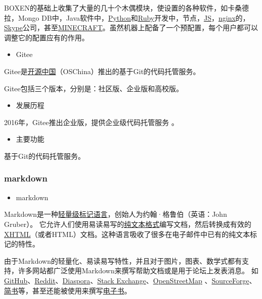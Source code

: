 \documentclass[
]{article}
\begin{document}
BOXEN的基础上收集了大量的几十个木偶模块，使设置的各种软件，如卡桑德拉，Mongo
DB中，Java软件中，\href{https://baike.baidu.com/item/Python/407313}{Python}和\href{https://baike.baidu.com/item/Ruby/11419}{Ruby}开发中，节点，\href{https://baike.baidu.com/item/JS/10687961}{JS}，\href{https://baike.baidu.com/item/nginx/3817705}{nginx}的，\href{https://baike.baidu.com/item/Skype}{Skype}公司，甚至\href{https://baike.baidu.com/item/MINECRAFT}{MINECRAFT}。虽然机器上配备了一个预配置，每个用户都可以调整它的配置应有的作用。

\begin{itemize}
\item
  Gitee
\end{itemize}

Gitee是\href{https://baike.baidu.com/item/开源中国/5462428}{开源中国}（OSChina）推出的基于Git的代码托管服务。

Gitee包括三个版本，分别是：社区版、企业版和高校版。

\begin{itemize}
\item
  发展历程
\end{itemize}

2016年，Gitee推出企业版，提供企业级代码托管服务 。

\begin{itemize}
\item
  主要功能
\end{itemize}

基于Git的代码托管服务。

\hypertarget{markdown}{%
\subsubsection{markdown}\label{markdown}}

\begin{itemize}
\item
  markdown
\end{itemize}

Markdown是一种\href{https://baike.baidu.com/item/轻量级标记语言/52671915}{轻量级标记语言}，创始人为约翰·格鲁伯（英语：John
Gruber）。
它允许人们使用易读易写的\href{https://baike.baidu.com/item/纯文本格式/9862288}{纯文本格式}编写文档，然后转换成有效的\href{https://baike.baidu.com/item/XHTML/316621}{XHTML}（或者HTML）文档。这种语言吸收了很多在电子邮件中已有的纯文本标记的特性。

由于Markdown的轻量化、易读易写特性，并且对于图片，图表、数学式都有支持，许多网站都广泛使用Markdown来撰写帮助文档或是用于论坛上发表消息。
如\href{https://baike.baidu.com/item/GitHub/10145341}{GitHub}、\href{https://baike.baidu.com/item/Reddit/1272010}{Reddit}、\href{https://baike.baidu.com/item/Diaspora/10726893}{Diaspora}、\href{https://baike.baidu.com/item/Stack\%20Exchange/13777796}{Stack
Exchange}、\href{https://baike.baidu.com/item/OpenStreetMap/3171606}{OpenStreetMap}
、\href{https://baike.baidu.com/item/SourceForge/6562141}{SourceForge}、\href{https://baike.baidu.com/item/简书/5782216}{简书}等，甚至还能被使用来撰写\href{https://baike.baidu.com/item/电子书/346054}{电子书}。
\end{document}
